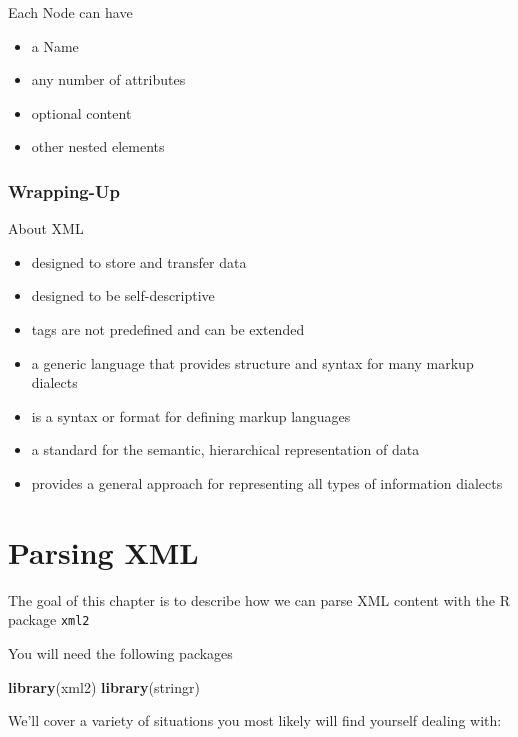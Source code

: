 \documentclass[
]{book}
\newenvironment{Shaded}{\begin{snugshade}}{\end{snugshade}}
\newcommand{\FunctionTok}[1]{\textcolor[rgb]{0.13,0.29,0.53}{\textbf{#1}}}
\newcommand{\NormalTok}[1]{#1}
\providecommand{\tightlist}{%
  \setlength{\itemsep}{0pt}\setlength{\parskip}{0pt}}
\begin{document}
Each Node can have

\begin{itemize}
\tightlist
\item
  a Name
\item
  any number of attributes
\item
  optional content
\item
  other nested elements
\end{itemize}

\hypertarget{wrapping-up}{%
\subsection{Wrapping-Up}\label{wrapping-up}}

About XML

\begin{itemize}
\tightlist
\item
  designed to store and transfer data
\item
  designed to be self-descriptive
\item
  tags are not predefined and can be extended
\item
  a generic language that provides structure and syntax for many markup dialects
\item
  is a syntax or format for defining markup languages
\item
  a standard for the semantic, hierarchical representation of data
\item
  provides a general approach for representing all types of information dialects
\end{itemize}

\hypertarget{parsing-xml}{%
\chapter{Parsing XML}\label{parsing-xml}}

The goal of this chapter is to describe how we can parse XML content
with the R package \texttt{xml2}

You will need the following packages

\begin{Shaded}
\begin{Highlighting}[]
\FunctionTok{library}\NormalTok{(xml2)}
\FunctionTok{library}\NormalTok{(stringr)}
\end{Highlighting}
\end{Shaded}

We'll cover a variety of situations you most likely will find yourself dealing
with:
\end{document}
